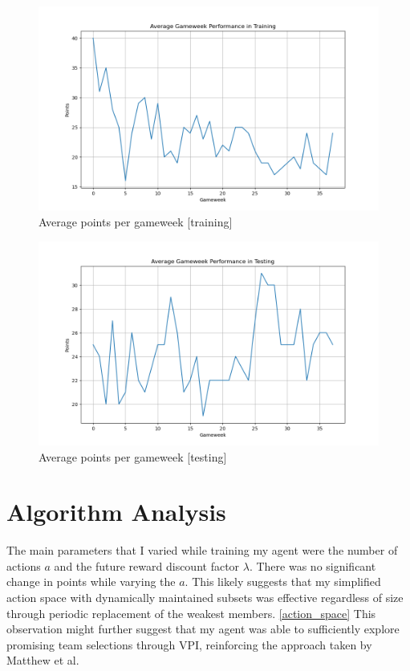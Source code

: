 \begin{figure}[h]
    \centering
    \includegraphics[width=1.0\textwidth]{figs/train_average_gameweek_performance.png}
    \vskip 0.2in
    \caption{Average points per gameweek [training]}
    \label{fig:train_average_gameweek_performance}
\end{figure}

\begin{figure}[h]
    \centering
    \includegraphics[width=1.0\textwidth]{figs/test_average_gameweek_performance.png}
    \vskip 0.2in
    \caption{Average points per gameweek [testing]}
    \label{fig:test_average_gameweek_performance}
\end{figure}

\section{Algorithm Analysis}
The main parameters that I varied while training my agent were the number of actions $a$ and the future reward discount factor $\lambda$. There was no significant change in points while varying the $a$. This likely suggests that my simplified action space with dynamically maintained subsets was effective regardless of size through periodic replacement of the weakest members. \ref{action_space} This observation might further suggest that my agent was able to sufficiently explore promising team selections through VPI, reinforcing the approach taken by Matthew et al. \cite{matthews2012}

